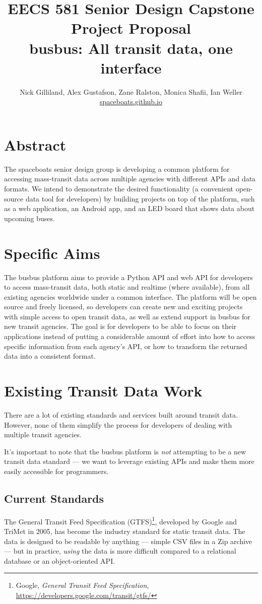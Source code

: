 \documentclass[12pt]{article}
\title{EECS 581 Senior Design Capstone Project Proposal \\
busbus: All transit data, one interface}
\author{Nick Gilliland, Alex Gustafson, Zane Ralston, Monica Shafii, Ian Weller \\ \url{spaceboats.github.io}}
\begin{document}
\maketitle

\section{Abstract}

The spaceboats senior design group is developing a common platform for accessing mass-transit data
across multiple agencies with different APIs and data formats.
We intend to demonstrate the desired functionality (a convenient open-source data tool
for developers) by building projects on top of the platform, such as a web application, an Android app, and
an LED board that shows data about upcoming buses.

\section{Specific Aims}

The busbus platform aims to provide a Python API and web API for developers to access
mass-transit data, both static and realtime (where available), from all existing agencies worldwide
under a common interface.
The platform will be open source and freely licensed, so developers can create new and exciting projects
with simple access to open transit data, as well as extend support in busbus for new transit agencies.
The goal is for
developers to be able to focus on their applications instead of putting a considerable amount of
effort into how to access specific information from each agency's API, or how to transform
the returned data into a consistent format.

\section{Existing Transit Data Work}
There are a lot of existing standards and services built around transit data.
However, none of them simplify the process for developers of dealing with multiple transit agencies.

It's important to note that the busbus platform is \textit{not} attempting to be a new transit data standard ---
we want to leverage existing APIs and make them more easily accessible for programmers.

\subsection{Current Standards}
The General Transit Feed Specification (GTFS)\footnote{Google, \textit{General Transit Feed Specification},
\url{https://developers.google.com/transit/gtfs/}},
developed by Google and TriMet in 2005, has become the industry standard for static transit data.
The data is designed to be readable by anything --- simple CSV files in a Zip archive ---
but in practice, \textit{using} the data is more difficult compared to a relational database
or an object-oriented API.
\end{document}
